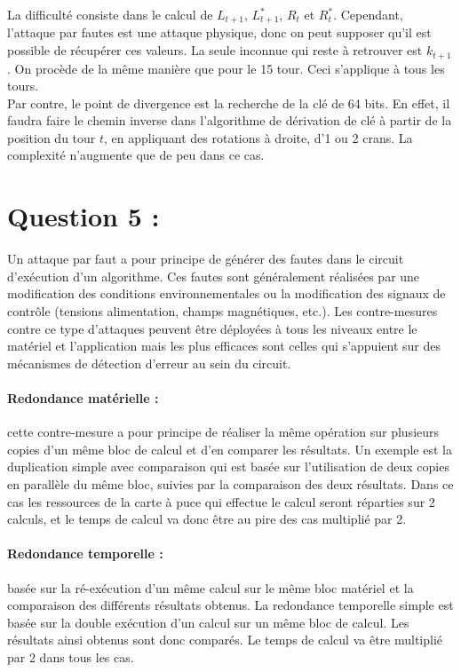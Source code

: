 		La difficulté consiste dans le calcul de $L_{t+1}$, $L_{t+1}^{*}$, $R_{t}$ et $R_{t}^{*}$. Cependant, l'attaque par fautes est une attaque physique, donc on peut supposer qu'il est possible de récupérer ces valeurs. La seule inconnue qui reste à retrouver est $k_{t+1}$. On procède de la même manière que pour le 15 tour. Ceci s'applique à tous les tours.\\
		\indent Par contre, le point de divergence est la recherche de la clé de 64 bits. En effet, il faudra faire le chemin inverse dans l'algorithme de dérivation de clé à partir de la position du tour $t$, en appliquant des rotations à droite, d'1 ou 2 crans. La complexité n'augmente que de peu dans ce cas.
		
	\section*{Question 5 :}
	Un attaque par faut a pour principe de générer des fautes dans le circuit d'exécution d'un algorithme. Ces fautes sont généralement réalisées par une modification des conditions environnementales ou la modification des signaux de contrôle (tensions alimentation, champs magnétiques, etc.). Les contre-mesures contre ce type d'attaques peuvent être déployées à tous les niveaux entre le matériel et l'application mais les plus efficaces sont celles qui s'appuient sur des mécanismes de détection d’erreur au sein du circuit.
	
	\paragraph{Redondance matérielle :} cette contre-mesure a pour principe de réaliser la même opération sur plusieurs copies d’un même bloc de calcul et d’en comparer les résultats. Un exemple est la duplication simple avec comparaison qui est basée sur l’utilisation de deux copies en parallèle du même bloc, suivies par la comparaison des deux résultats. Dans ce cas les ressources de la carte à puce qui effectue le calcul seront réparties sur 2 calculs, et le temps de calcul va donc être au pire des cas multiplié par 2.
	
	\paragraph{Redondance temporelle :} basée sur la ré-exécution d’un même calcul sur le même bloc matériel et la comparaison des différents résultats obtenus. La redondance temporelle simple est basée sur la double exécution d’un calcul sur un même bloc de calcul. Les résultats ainsi obtenus sont donc comparés. Le temps de calcul va être multiplié par 2 dans tous les cas.
	

